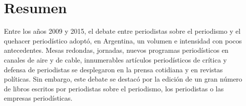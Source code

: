 



\ifPDF


\usepackage[hyphenation,homeoarchy,homeoarchywordcolor=orange, homeoarchycharcolor=orange,draft]{impnattypo}
\usepackage[allcolors=magenta, colorlinks, unicode]{hyperref}
\usepackage{easyReview}
\usepackage{hyperxmp}

	\else
	\ifBNPDF
	\usepackage[width=18truecm,height=25.5truecm,cam,center]{crop}
	\newcommand*\infofont[1]{\sf{\footnotesize #1 (candeladinicola2002@gmail.com)}}
	\crop[font=infofont]
	\usepackage[hidelinks, unicode]{hyperref}
	\usepackage{hyperxmp}
	
		\else
		\ifPNGEPUB
		\usepackage[hidelinks, unicode]{hyperref}
			\else
			\ifHTMLEPUB
			\usepackage[allcolors=blue,colorlinks,hyperindex=true,unicode]{hyperref}
			\fi
		\fi
	\fi
\fi




\frontmatter











\chapter{Resumen}

Entre los años 2009 y 2015, el debate entre periodistas sobre el periodismo y el quehacer periodístico adoptó, en Argentina, un volumen e intensidad con pocos antecedentes. Mesas redondas, jornadas, nuevos programas periodísticos en canales de aire y de cable, innumerables artículos periodísticos de crítica y defensa de periodistas se desplegaron en la prensa cotidiana y en revistas políticas. Sin embargo, este debate se destacó por la edición de un gran número de libros escritos por periodistas sobre el periodismo, los periodistas o las empresas periodísticas.

